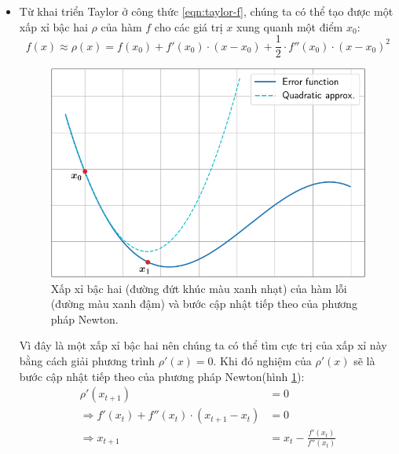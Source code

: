 \begin{itemize}
	\item Từ khai triển Taylor ở công thức \ref{eqn:taylor-f}, chúng ta có thể tạo được một xấp xỉ bậc hai $\rho$ của hàm $f$ cho các giá trị $x$ xung quanh một điểm $x_0$:
	\begin{equation}
		\label{eqn:quad-approx}
		f(x) \approx \rho(x) = f(x_0) + f'(x_0) \cdot (x - x_0) + \frac{1}{2} \cdot f''(x_0) \cdot (x - x_0)^2
	\end{equation}
	\begin{figure}[htp]
		\centering
		\includegraphics[width=150 mm]{images/quad-approx.png}
		\caption{Xấp xỉ bậc hai (đường đứt khúc màu xanh nhạt) của hàm lỗi (đường màu xanh đậm) và bước cập nhật tiếp theo của phương pháp Newton.}
		\label{fig:newton-step}
	\end{figure}
	Vì đây là một xấp xỉ bậc hai nên chúng ta có thể tìm cực trị của xấp xỉ này bằng cách giải phương trình $\rho '(x) = 0$. Khi đó nghiệm của $\rho'(x)$ sẽ là bước cập nhật tiếp theo của phương pháp Newton(hình \ref{fig:newton-step}):
	\begin{equation} \label{eqn:newton-update}
		\begin{aligned}
			\rho'(x_{t+1}) &= 0 \\
			\Rightarrow f'(x_t) + f''(x_t) \cdot (x_{t+1} - x_t) &= 0 \\
			\Rightarrow x_{t+1} &= x_t - \frac{f'(x_t)}{f''(x_t)}
		\end{aligned}
	\end{equation}


\end{itemize}
